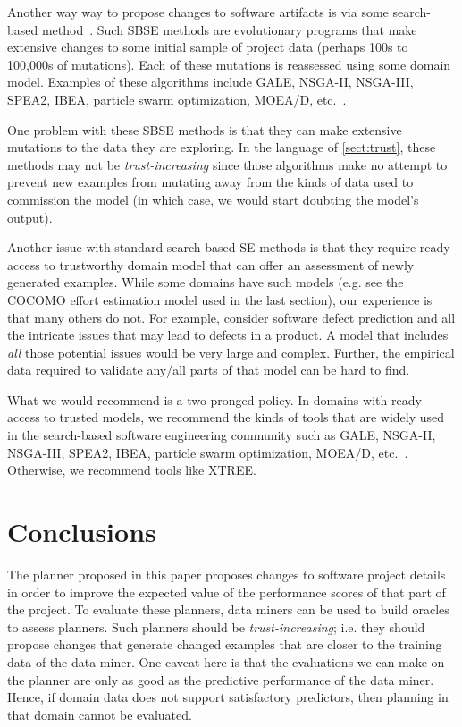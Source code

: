 \documentclass{sig-alternate}
\newcommand{\tion}[1]{\textsection\ref{sect:#1}}
\begin{document}
{\begin{itemize}[leftmargin=3mm]
Another way way to propose changes to software artifacts
is   via some search-based method~\cite{Harman2009,Harman2011}. Such SBSE methods are   evolutionary programs that 
make
 extensive changes to  some initial sample of project data
 (perhaps 
100s to 100,000s of mutations). Each of these mutations
is reassessed using some domain model.
Examples of these algorithms include GALE, NSGA-II, NSGA-III, SPEA2, IBEA, particle swarm optimization, MOEA/D, etc.~\cite{krall14,deb00a,zit02,zit04,%
deb14,Cui2005a,zhang07:TEC}.

One problem with these   SBSE methods is that they can  make extensive mutations to the data they are exploring. In the language
of \tion{trust}, these methods may not be {\em trust-increasing} since those algorithms make no attempt
to prevent new examples from mutating away from the kinds of data used to commission the model (in which case, we would
start doubting the model's output).

Another issue with standard search-based SE methods is that they require ready access to 
trustworthy domain model that can offer an assessment
of newly generated examples. While some domains have such models (e.g. see the COCOMO effort estimation model
used in the last section), our experience is that many others do not.  For example, 
consider software defect prediction and all the intricate issues that may lead to defects in a product. A model that includes {\em all} those
potential issues would be very large and complex. Further,
the empirical data required to validate any/all parts
of that model can be hard to find.

What we would recommend is a two-pronged policy.
In domains with ready access to trusted models, we recommend
the kinds of tools that are widely used in the search-based
software engineering community such as GALE, NSGA-II, NSGA-III, SPEA2, IBEA, particle swarm optimization, MOEA/D, etc.~\cite{krall14,deb00a,zit02,zit04,%
deb14,Cui2005a,zhang07:TEC}. Otherwise, we recommend tools like XTREE.

\section{Conclusions}

The planner proposed in this paper proposes changes to software project details in order to improve the expected
value of the performance scores of that part of the project.
To evaluate these planners,
data miners can be used to build oracles to assess planners.
Such planners should be {\em trust-increasing}; i.e. they should propose changes that generate
changed examples that are closer to the training data of the data miner.
One caveat here is that the evaluations we can make on the planner are only as good as the predictive
performance of the data miner. Hence, if domain data does not support satisfactory predictors, then
planning in that domain cannot be evaluated.


\end{itemize}}
\end{document}
